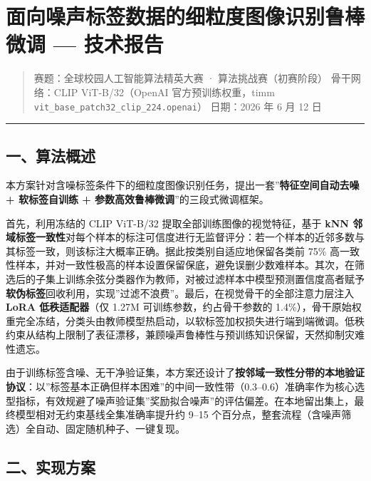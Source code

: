 \documentclass[
]{article}
\author{}
\date{}
\begin{document}
\section{面向噪声标签数据的细粒度图像识别鲁棒微调 ---
技术报告}\label{ux9762ux5411ux566aux58f0ux6807ux7b7eux6570ux636eux7684ux7ec6ux7c92ux5ea6ux56feux50cfux8bc6ux522bux9c81ux68d2ux5faeux8c03-ux6280ux672fux62a5ux544a}

\begin{quote}
赛题：全球校园人工智能算法精英大赛 · 算法挑战赛（初赛阶段）
骨干网络：CLIP ViT-B/32（OpenAI 官方预训练权重，timm
\texttt{vit\_base\_patch32\_clip\_224.openai}） 日期：2026 年 6 月 12 日
\end{quote}

\begin{center}\rule{0.5\linewidth}{0.5pt}\end{center}

\subsection{一、算法概述}\label{ux4e00ux7b97ux6cd5ux6982ux8ff0}

本方案针对含噪标签条件下的细粒度图像识别任务，提出一套''\textbf{特征空间自动去噪
+ 软标签自训练 + 参数高效鲁棒微调}''的三段式微调框架。

首先，利用冻结的 CLIP ViT-B/32 提取全部训练图像的视觉特征，基于
\textbf{kNN
邻域标签一致性}对每个样本的标注可信度进行无监督评分：若一个样本的近邻多数与其标签一致，则该标注大概率正确。据此按类别自适应地保留各类前
75\%
高一致性样本，并对一致性极高的样本设置保留保底，避免误删少数难样本。其次，在筛选后的子集上训练余弦分类器作为教师，对被过滤样本中模型预测置信度高者赋予\textbf{软伪标签}回收利用，实现''过滤不浪费''。最后，在视觉骨干的全部注意力层注入
\textbf{LoRA 低秩适配器}（仅 1.27M 可训练参数，约占骨干参数的
1.4\%），骨干原始权重完全冻结，分类头由教师模型热启动，以软标签加权损失进行端到端微调。低秩约束从结构上限制了表征漂移，兼顾噪声鲁棒性与预训练知识保留，天然抑制灾难性遗忘。

由于训练标签含噪、无干净验证集，本方案还设计了\textbf{按邻域一致性分带的本地验证协议}：以''标签基本正确但样本困难''的中间一致性带（0.3--0.6）准确率作为核心选型指标，有效规避了噪声验证集''奖励拟合噪声''的评估偏差。在本地留出集上，最终模型相对无约束基线全集准确率提升约
9--15 个百分点，整套流程（含噪声筛选）全自动、固定随机种子、一键复现。

\subsection{二、实现方案}\label{ux4e8cux5b9eux73b0ux65b9ux6848}
\end{document}
